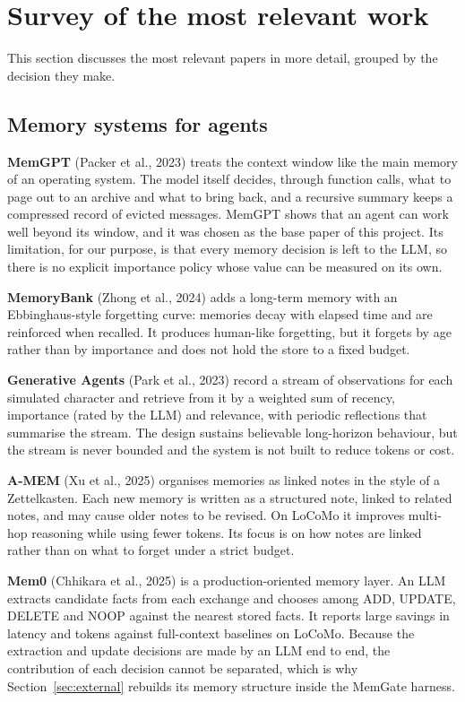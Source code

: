 \section{Survey of the most relevant work}

This section discusses the most relevant papers in more detail, grouped by
the decision they make.

\subsection{Memory systems for agents}

\textbf{MemGPT} (Packer et al., 2023) \cite{packer2023memgpt} treats the
context window like the main memory of an operating system. The model itself
decides, through function calls, what to page out to an archive and what to
bring back, and a recursive summary keeps a compressed record of evicted
messages. MemGPT shows that an agent can work well beyond its window, and it
was chosen as the base paper of this project. Its limitation, for our
purpose, is that every memory decision is left to the LLM, so there is no
explicit importance policy whose value can be measured on its own.

\textbf{MemoryBank} (Zhong et al., 2024) \cite{zhong2024memorybank} adds a
long-term memory with an Ebbinghaus-style forgetting curve: memories decay
with elapsed time and are reinforced when recalled. It produces human-like
forgetting, but it forgets by age rather than by importance and does not hold
the store to a fixed budget.

\textbf{Generative Agents} (Park et al., 2023) \cite{park2023generative}
record a stream of observations for each simulated character and retrieve
from it by a weighted sum of recency, importance (rated by the LLM) and
relevance, with periodic reflections that summarise the stream. The design
sustains believable long-horizon behaviour, but the stream is never bounded
and the system is not built to reduce tokens or cost.

\textbf{A-MEM} (Xu et al., 2025) \cite{xu2025amem} organises memories as
linked notes in the style of a Zettelkasten. Each new memory is written as a
structured note, linked to related notes, and may cause older notes to be
revised. On LoCoMo it improves multi-hop reasoning while using fewer tokens.
Its focus is on how notes are linked rather than on what to forget under a
strict budget.

\textbf{Mem0} (Chhikara et al., 2025) \cite{chhikara2025mem0} is a
production-oriented memory layer. An LLM extracts candidate facts from each
exchange and chooses among ADD, UPDATE, DELETE and NOOP against the nearest
stored facts. It reports large savings in latency and tokens against
full-context baselines on LoCoMo. Because the extraction and update decisions
are made by an LLM end to end, the contribution of each decision cannot be
separated, which is why Section~\ref{sec:external} rebuilds its memory
structure inside the MemGate harness.

